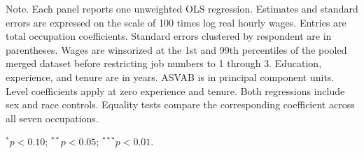\begin{table}[p]
\begin{threeparttable}
\begin{tablenotes}[flushleft]\scriptsize
\item Note. Each panel reports one unweighted OLS regression. Estimates and standard errors are expressed on the scale of 100 times log real hourly wages. Entries are total occupation coefficients. Standard errors clustered by respondent are in parentheses. 
Wages are winsorized at the 1st and 99th percentiles of the pooled merged dataset before restricting job numbers to 1 through 3. Education, experience, and tenure are in years. ASVAB is in principal component units. Level coefficients apply at zero experience and tenure. 
Both regressions include sex and race controls. Equality tests compare the corresponding coefficient across all seven occupations.
\item \(^{*}p<0.10\); \(^{**}p<0.05\); \(^{***}p<0.01\).
\end{tablenotes}\end{threeparttable}\end{table}

